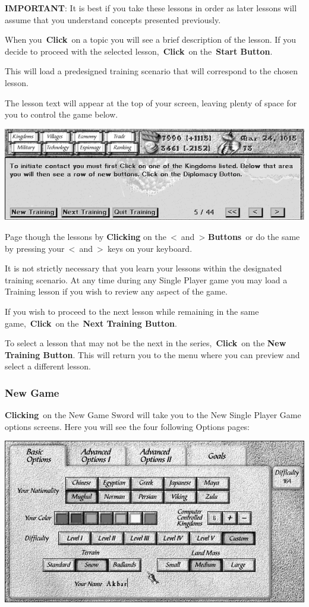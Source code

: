 \textbf{IMPORTANT}: It is best if you take these lessons in order as later lessons will assume that you understand concepts presented previously.

When you \textbf{Click} on a topic you will see a brief description of the lesson. If you decide to proceed with the selected lesson, \textbf{Click} on the \textbf{Start Button}.

This will load a predesigned training scenario that will correspond to the chosen lesson.

The lesson text will appear at the top of your screen, leaving plenty of space for you to control the game below.

\begin{center}
	\includegraphics[width=0.7\linewidth]{Ilesson}
\end{center}


Page though the lessons by \textbf{Clicking} on the < and > \textbf{Buttons} or do the same by pressing your < and > keys on your keyboard.

It is not strictly necessary that you learn your lessons within the designated training scenario. At any time during any Single Player game you may load a Training lesson if you wish to review any aspect of the game.

If you wish to proceed to the next lesson while remaining in the same game, \textbf{Click} on the \textbf{Next Training Button}.

To select a lesson that may not be the next in the series, \textbf{Click} on the \textbf{New Training Button}. This will return you to the menu where you can preview and select a different lesson.

\subsubsection{New Game}

\textbf{Clicking} on the New Game Sword will take you to the New Single Player Game options screens. Here you will see the four following Options pages:

\begin{center}
	\includegraphics[width=0.7\linewidth]{Ibasicoptions}
\end{center}

